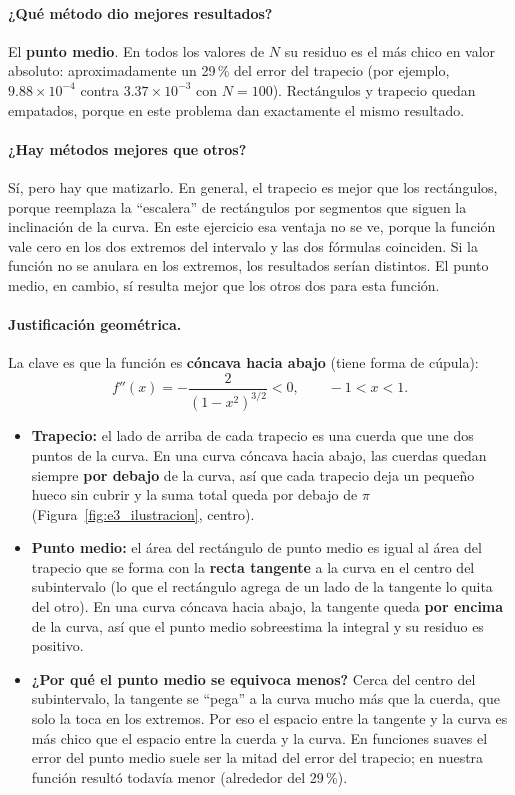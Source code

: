 \paragraph{¿Qué método dio mejores resultados?}
El \textbf{punto medio}. En todos los valores de \(N\) su residuo es el más chico en valor absoluto: aproximadamente un 29\,\% del error del trapecio (por ejemplo, \(9.88\times10^{-4}\) contra \(3.37\times10^{-3}\) con \(N=100\)). Rectángulos y trapecio quedan empatados, porque en este problema dan exactamente el mismo resultado.

\paragraph{¿Hay métodos mejores que otros?}
Sí, pero hay que matizarlo. En general, el trapecio es mejor que los rectángulos, porque reemplaza la ``escalera'' de rectángulos por segmentos que siguen la inclinación de la curva. En este ejercicio esa ventaja no se ve, porque la función vale cero en los dos extremos del intervalo y las dos fórmulas coinciden. Si la función no se anulara en los extremos, los resultados serían distintos. El punto medio, en cambio, sí resulta mejor que los otros dos para esta función.

\paragraph{Justificación geométrica.}
La clave es que la función es \textbf{cóncava hacia abajo} (tiene forma de cúpula):
\[
f''(x)=-\frac{2}{(1-x^2)^{3/2}}<0,\qquad -1<x<1.
\]
\begin{itemize}
    \item \textbf{Trapecio:} el lado de arriba de cada trapecio es una cuerda que une dos puntos de la curva. En una curva cóncava hacia abajo, las cuerdas quedan siempre \textbf{por debajo} de la curva, así que cada trapecio deja un pequeño hueco sin cubrir y la suma total queda por debajo de \(\pi\) (Figura~\ref{fig:e3_ilustracion}, centro).
    \item \textbf{Punto medio:} el área del rectángulo de punto medio es igual al área del trapecio que se forma con la \textbf{recta tangente} a la curva en el centro del subintervalo (lo que el rectángulo agrega de un lado de la tangente lo quita del otro). En una curva cóncava hacia abajo, la tangente queda \textbf{por encima} de la curva, así que el punto medio sobreestima la integral y su residuo es positivo.
    \item \textbf{¿Por qué el punto medio se equivoca menos?} Cerca del centro del subintervalo, la tangente se ``pega'' a la curva mucho más que la cuerda, que solo la toca en los extremos. Por eso el espacio entre la tangente y la curva es más chico que el espacio entre la cuerda y la curva. En funciones suaves el error del punto medio suele ser la mitad del error del trapecio; en nuestra función resultó todavía menor (alrededor del 29\,\%).
\end{itemize}

